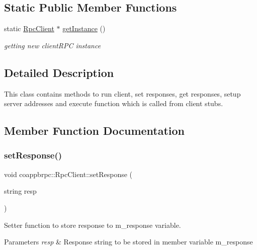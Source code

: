 \subsection*{Static Public Member Functions}
\begin{DoxyCompactItemize}
\item 
\mbox{\label{classcoappbrpc_1_1RpcClient_a36bb0e75fae00e4ea9e643d8c1b16f5c}} 
static \hyperlink{classcoappbrpc_1_1RpcClient}{Rpc\+Client} $\ast$ \hyperlink{classcoappbrpc_1_1RpcClient_a36bb0e75fae00e4ea9e643d8c1b16f5c}{get\+Instance} ()
\begin{DoxyCompactList}\small\item\em getting new client\+R\+PC instance \end{DoxyCompactList}\end{DoxyCompactItemize}


\subsection{Detailed Description}
This class contains methods to run client, set responses, get responses, setup server addresses and execute function which is called from client stubs. 

\subsection{Member Function Documentation}
\mbox{\label{classcoappbrpc_1_1RpcClient_a0f08b63838a62377d4470eb2a0259178}} 
\subsubsection{\texorpdfstring{set\+Response()}{setResponse()}}
{\footnotesize\ttfamily void coappbrpc\+::\+Rpc\+Client\+::set\+Response (\begin{DoxyParamCaption}\item[{string}]{resp }\end{DoxyParamCaption})}



Setter function to store response to m\+\_\+response variable. 


\begin{DoxyParams}{Parameters}
{\em resp} & Response string to be stored in member variable m\+\_\+response \\
\hline
\end{DoxyParams}
\mbox{\label{classcoappbrpc_1_1RpcClient_a69755d690a7f2d6373e191d359e48986}} 

